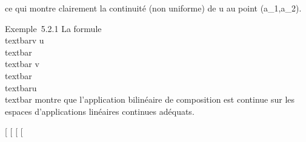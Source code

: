 \documentclass[]{article}
\begin{document}
ce qui montre clairement la continuité (non uniforme) de u au point
(a\_1,a\_2).

Exemple~5.2.1 La formule \\textbar{}v \cdot
u\\textbar{} \leq\\textbar{}
v\\textbar{}\,\\textbar{}u\\textbar{}
montre que l'application bilinéaire de composition est continue sur les
espaces d'applications linéaires continues adéquats.

{[}
{[}
{[}
{[}
\end{document}
